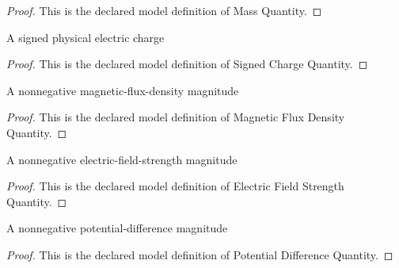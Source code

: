 \begin{proof}
  This is the declared model definition of Mass Quantity.
\end{proof}
\begin{definition}
  \label{def:physics:phyx-mini-0634:phyxminiproblems-problemphyxmini0634-signedchargequantity}
  A signed physical electric charge
\end{definition}
\begin{proof}
  This is the declared model definition of Signed Charge Quantity.
\end{proof}
\begin{definition}
  \label{def:physics:phyx-mini-0634:phyxminiproblems-problemphyxmini0634-magneticfluxdensityquantity}
  A nonnegative magnetic-flux-density magnitude
\end{definition}
\begin{proof}
  This is the declared model definition of Magnetic Flux Density Quantity.
\end{proof}
\begin{definition}
  \label{def:physics:phyx-mini-0634:phyxminiproblems-problemphyxmini0634-electricfieldstrengthquantity}
  A nonnegative electric-field-strength magnitude
\end{definition}
\begin{proof}
  This is the declared model definition of Electric Field Strength Quantity.
\end{proof}
\begin{definition}
  \label{def:physics:phyx-mini-0634:phyxminiproblems-problemphyxmini0634-potentialdifferencequantity}
  A nonnegative potential-difference magnitude
\end{definition}
\begin{proof}
  This is the declared model definition of Potential Difference Quantity.
\end{proof}
